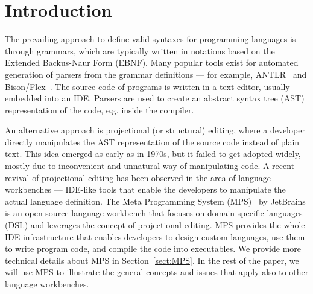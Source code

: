 \section{Introduction}

The prevailing approach to define valid syntaxes for programming languages is through grammars, which are typically written in notations based on the Extended Backus-Naur Form (EBNF).
Many popular tools exist for automated generation of parsers from the grammar definitions --- for example, ANTLR~\cite{ref:ANTLR} and Bison/Flex~\cite{ref:BISONFLEX}.
The source code of programs is written in a text editor, usually embedded into an IDE. Parsers are used to create an abstract syntax tree (AST) representation of the code, e.g. inside the compiler.

An alternative approach is projectional (or structural) editing, where a developer directly manipulates the AST representation of the source code instead of plain text.
This idea emerged as early as in 1970s, but it failed to get adopted widely, mostly due to inconvenient and unnatural way of manipulating code.
A recent revival of projectional editing has been observed in the area of language workbenches --- IDE-like tools that enable the developers to manipulate the actual language definition.
The Meta Programming System (MPS)~\cite{ref:MPS} by JetBrains is an open-source language workbench that focuses on domain specific languages (DSL) and leverages the concept of projectional editing.
MPS provides the whole IDE infrastructure that enables developers to design custom languages, use them to write program code, and compile the code into executables.
We provide more technical details about MPS in Section~\ref{sect:MPS}.
In the rest of the paper, we will use MPS to illustrate the general concepts and issues that apply also to other language workbenches.


